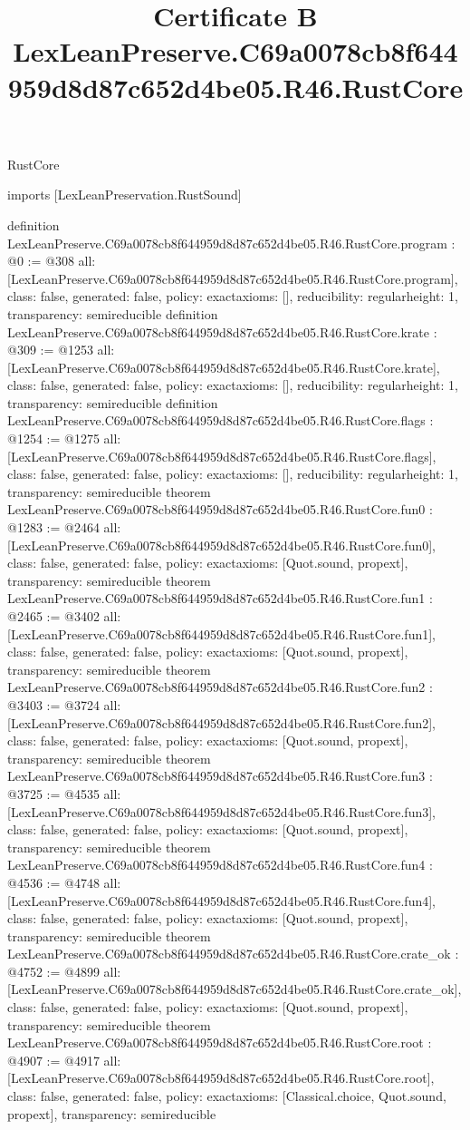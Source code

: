 \begin{lexlean}{RustCore}
\title{Certificate B LexLeanPreserve.C69a0078cb8f644959d8d87c652d4be05.R46.RustCore}
\begin{coremodule}
imports [LexLeanPreservation.RustSound]

definition LexLeanPreserve.C69a0078cb8f644959d8d87c652d4be05.R46.RustCore.program : @0 := @308 {
  all: [LexLeanPreserve.C69a0078cb8f644959d8d87c652d4be05.R46.RustCore.program],
  class: false,
  generated: false,
  policy: exact{axioms: []},
  reducibility: regular{height: 1},
  transparency: semireducible
}
definition LexLeanPreserve.C69a0078cb8f644959d8d87c652d4be05.R46.RustCore.krate : @309 := @1253 {
  all: [LexLeanPreserve.C69a0078cb8f644959d8d87c652d4be05.R46.RustCore.krate],
  class: false,
  generated: false,
  policy: exact{axioms: []},
  reducibility: regular{height: 1},
  transparency: semireducible
}
definition LexLeanPreserve.C69a0078cb8f644959d8d87c652d4be05.R46.RustCore.flags : @1254 := @1275 {
  all: [LexLeanPreserve.C69a0078cb8f644959d8d87c652d4be05.R46.RustCore.flags],
  class: false,
  generated: false,
  policy: exact{axioms: []},
  reducibility: regular{height: 1},
  transparency: semireducible
}
theorem LexLeanPreserve.C69a0078cb8f644959d8d87c652d4be05.R46.RustCore.fun0 : @1283 := @2464 {
  all: [LexLeanPreserve.C69a0078cb8f644959d8d87c652d4be05.R46.RustCore.fun0],
  class: false,
  generated: false,
  policy: exact{axioms: [Quot.sound, propext]},
  transparency: semireducible
}
theorem LexLeanPreserve.C69a0078cb8f644959d8d87c652d4be05.R46.RustCore.fun1 : @2465 := @3402 {
  all: [LexLeanPreserve.C69a0078cb8f644959d8d87c652d4be05.R46.RustCore.fun1],
  class: false,
  generated: false,
  policy: exact{axioms: [Quot.sound, propext]},
  transparency: semireducible
}
theorem LexLeanPreserve.C69a0078cb8f644959d8d87c652d4be05.R46.RustCore.fun2 : @3403 := @3724 {
  all: [LexLeanPreserve.C69a0078cb8f644959d8d87c652d4be05.R46.RustCore.fun2],
  class: false,
  generated: false,
  policy: exact{axioms: [Quot.sound, propext]},
  transparency: semireducible
}
theorem LexLeanPreserve.C69a0078cb8f644959d8d87c652d4be05.R46.RustCore.fun3 : @3725 := @4535 {
  all: [LexLeanPreserve.C69a0078cb8f644959d8d87c652d4be05.R46.RustCore.fun3],
  class: false,
  generated: false,
  policy: exact{axioms: [Quot.sound, propext]},
  transparency: semireducible
}
theorem LexLeanPreserve.C69a0078cb8f644959d8d87c652d4be05.R46.RustCore.fun4 : @4536 := @4748 {
  all: [LexLeanPreserve.C69a0078cb8f644959d8d87c652d4be05.R46.RustCore.fun4],
  class: false,
  generated: false,
  policy: exact{axioms: [Quot.sound, propext]},
  transparency: semireducible
}
theorem LexLeanPreserve.C69a0078cb8f644959d8d87c652d4be05.R46.RustCore.crate_ok : @4752 := @4899 {
  all: [LexLeanPreserve.C69a0078cb8f644959d8d87c652d4be05.R46.RustCore.crate_ok],
  class: false,
  generated: false,
  policy: exact{axioms: [Quot.sound, propext]},
  transparency: semireducible
}
theorem LexLeanPreserve.C69a0078cb8f644959d8d87c652d4be05.R46.RustCore.root : @4907 := @4917 {
  all: [LexLeanPreserve.C69a0078cb8f644959d8d87c652d4be05.R46.RustCore.root],
  class: false,
  generated: false,
  policy: exact{axioms: [Classical.choice, Quot.sound, propext]},
  transparency: semireducible
}


\end{coremodule}
\end{lexlean}
